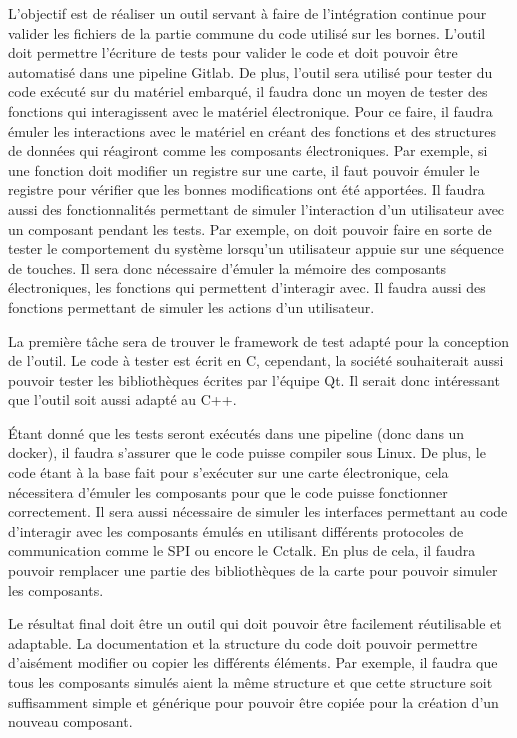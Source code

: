 \documentclass[a4paper]{article}
\begin{document}
L'objectif est de réaliser un outil servant à faire de l'intégration continue
pour valider les fichiers de la partie commune du code utilisé sur les bornes.
L'outil doit permettre l'écriture de tests pour valider le code et doit pouvoir
être automatisé dans une pipeline Gitlab. De plus, l'outil sera utilisé pour
tester du code exécuté sur du matériel embarqué, il faudra donc un moyen de
tester des fonctions qui interagissent avec le matériel électronique. Pour ce
faire, il faudra émuler les interactions avec le matériel en créant des
fonctions et des structures de données qui réagiront comme les composants
électroniques. Par exemple, si une fonction doit modifier un registre sur une
carte, il faut pouvoir émuler le registre pour vérifier que les bonnes
modifications ont été apportées. Il faudra aussi des fonctionnalités permettant
de simuler l'interaction d'un utilisateur avec un composant pendant les tests.
Par exemple, on doit pouvoir faire en sorte de tester le comportement du système
lorsqu'un utilisateur appuie sur une séquence de touches. Il sera donc
nécessaire d'émuler la mémoire des composants électroniques, les fonctions qui %
permettent d'interagir avec. Il faudra aussi des fonctions permettant de simuler
les actions d'un utilisateur.

La première tâche sera de trouver le framework de test adapté pour la conception
de l'outil. Le code à tester est écrit en C, cependant, la société souhaiterait
aussi pouvoir tester les bibliothèques écrites par l'équipe Qt. Il serait donc
intéressant que l'outil soit aussi adapté au C++.

Étant donné que les tests seront exécutés dans une pipeline (donc dans un
docker), il faudra s'assurer que le code puisse compiler sous Linux. De plus, le
code étant à la base fait pour s'exécuter sur une carte électronique, cela
nécessitera d'émuler les composants pour que le code puisse fonctionner
correctement. Il sera aussi nécessaire de simuler les interfaces permettant au
code d'interagir avec les composants émulés en utilisant différents protocoles
de communication comme le SPI ou encore le Cctalk. En plus de cela, il faudra
pouvoir remplacer une partie des bibliothèques de la carte pour pouvoir simuler
les composants.

Le résultat final doit être un outil qui doit pouvoir être facilement
réutilisable et adaptable. La documentation et la structure du code doit pouvoir
permettre d'aisément modifier ou copier les différents éléments. Par exemple, il
faudra que tous les composants simulés aient la même structure et que cette
structure soit suffisamment simple et générique pour pouvoir être copiée pour la
création d'un nouveau composant.
\end{document}
